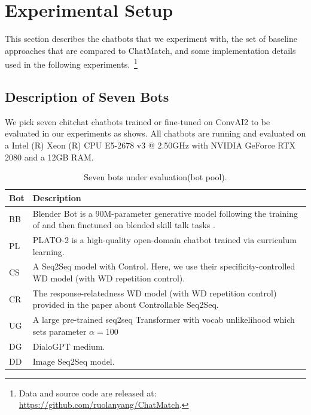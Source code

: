 \section{Experimental Setup}
\label{sec:experiment}
This section describes the chatbots that we experiment with, the
set of baseline approaches that are compared to ChatMatch, and some
implementation details used in the following experiments.~\footnote{Data and source code are
released at: \url{https://github.com/ruolanyang/ChatMatch}.}

\subsection{Description of Seven Bots}
We pick seven chitchat chatbots trained or fine-tuned on ConvAI2 \citep{dinan2019second} to be evaluated in our experiments 
as  shows.
All chatbots are running and evaluated on a Intel (R) Xeon (R) CPU 
E5-2678 v3 @ 2.50GHz with NVIDIA GeForce RTX 2080 and a 12GB RAM. 

\begin{table}[th]
\centering
\small
\begin{tabular}{p{}|p{}}
\toprule
\textbf{Bot} & \textbf{Description} \\ \midrule
BB & Blender Bot \citep{roller-etal-2021-recipes} is a
90M-parameter generative model following the training
of \citet{shuster-etal-2020-dialogue} and then finetuned on
blended skill talk tasks \cite{smith-etal-2020-put}.\\ \hline
 PL & PLATO-2 \citep{bao-etal-2021-plato} is a high-quality open-domain chatbot trained via curriculum learning.\\ \hline
 CS & A Seq2Seq model with Control.  \citep{see-etal-2019-makes} Here, we use their
specificity-controlled WD model (with WD repetition control).\\ \hline
CR & The response-relatedness WD model
(with WD repetition control) provided in the paper about
Controllable Seq2Seq. \citep{see-etal-2019-makes} \\ \hline
UG & A large pre-trained seq2seq Transformer
with vocab unlikelihood which sets parameter
$\alpha = 100$ \citep{li-etal-2020-dont} \\ \hline
DG & DialoGPT medium. \citep{zhang-etal-2020-dialogpt}\\ \hline
 DD & Image Seq2Seq model. \citep{shuster-etal-2020-dialogue} \\
\bottomrule
\end{tabular}
\caption{Seven bots under evaluation(bot pool).}
\label{tab:bots}
\end{table}


